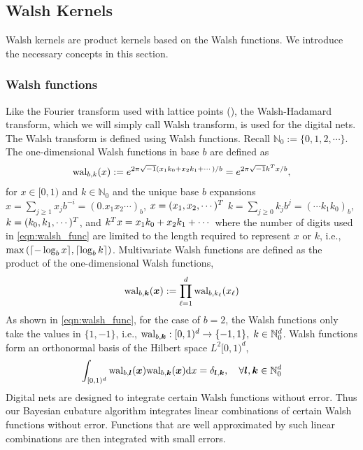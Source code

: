 \documentclass[graybox,footinfo]{svmult}
\let\vec\relax
\newcommand{\bm}[1]{\boldsymbol{#1}}
\newcommand{\dif}[1]{\text{d}{#1}}
\newcommand{\naturals}{\mathbb{N}}
\newcommand{\vk}{\bm{k}}
\newcommand{\vl}{\bm{l}}
\newcommand{\vx}{\bm{x}}
\newcommand{\dx}{\dif{{x}}}
\DeclarePairedDelimiter{\ceil}{\lceil}{\rceil}
\begin{document}
\subsection{Walsh Kernels}

Walsh kernels are product kernels based on the Walsh functions. We introduce the necessary concepts in this section.

\subsubsection{Walsh functions}
Like the Fourier transform used with lattice points (\cite{RatHic19a}), the Walsh-Hadamard transform, which we will simply call Walsh transform, is used for the digital nets. The Walsh transform is defined using Walsh functions. Recall $\naturals_0 := \lbrace 0,1,2,\cdots \rbrace$.
The one-dimensional Walsh functions in base $b$ are defined as
\begin{align}
\label{eqn:walsh_func}
\textup{wal}_{b,k}(x) := e^{2\pi \sqrt{-1} (x_1 k_0 + x_2 k_1 + \cdots)/b} 
=
e^{2\pi \sqrt{-1} {\vec{k}}^T{\vec{x}}/b},
\end{align}
for $x \in [0,1)$ and $k \in \naturals_0$ and the unique base $b$ expansions 
$x = \sum_{j \ge 1} x_j b^{-i} = (0.x_1 x_2 \cdots)_b$, $\vec{x} =  (x_1,x_2,\cdots )^T$
$k = \sum_{j \ge 0} k_j b^{j} = ( \cdots k_1 k_0)_b$, $\vec{k} =  (k_0,k_1,\cdots )^T$, and ${\vec{k}}^T{\vec{x}} = x_1 k_0 + x_2 k_1 + \cdots$
where the number of digits used in \eqref{eqn:walsh_func} are limited to the length required to represent $x$ or $k$, i.e., $\max \left( {\ceil{ -\log_b{x}}, \ceil{\log_b{k}}  } \right)$.
Multivariate Walsh functions are defined as the product of the one-dimensional Walsh functions,
\begin{align*}
\textup{wal}_{b,\vk} (\vx) := \prod_{\ell=1}^d \textup{wal}_{b,k_\ell} (x_\ell
)
\end{align*}
As shown in \eqref{eqn:walsh_func}, for the case of $b=2$, the Walsh functions only take the values in $\{1, -1\}$, i.e., $\textup{wal}_{b,\vk} : [0,1)^d \to {\{-1, 1\}} , \; k \in \naturals_0^d$. Walsh functions form an orthonormal basis of the Hilbert space $L^2[0,1)^d$,
\begin{align*}
\int_{[0,1)^d}
\textup{wal}_{b,\vl} (\vx) \textup{wal}_{b,\vk}(\vx) \dx = \delta_{\vl, \vk}, \quad \forall \vl, \vk \in \naturals_0^d
\end{align*}
Digital nets are designed to integrate certain Walsh functions without error.
Thus our Bayesian cubature algorithm integrates linear combinations of %
certain Walsh functions without error. Functions that are well approximated by such linear combinations are then integrated with small errors.
\end{document}
